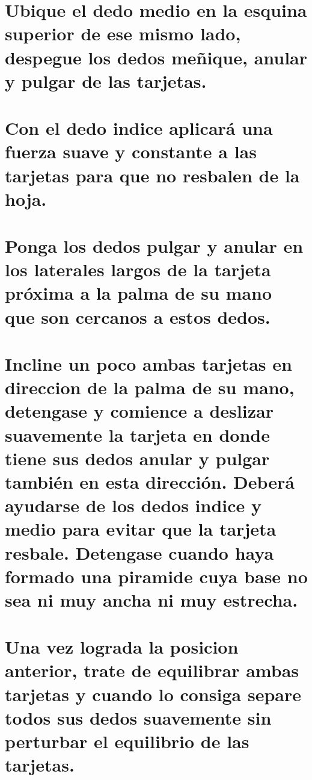 \documentclass{article}
\begin{document}
\section{Ubique el dedo medio en la esquina superior de ese mismo lado, despegue los dedos meñique, anular y pulgar de las tarjetas.}
\section{Con el dedo indice aplicará una fuerza suave y constante a las tarjetas para que no resbalen de la hoja.}
\newpage
\section{Ponga los dedos pulgar y anular en los laterales largos de la tarjeta próxima a la palma de su mano que son cercanos a estos dedos. }

\section{Incline un poco ambas tarjetas en direccion de la palma de su mano, detengase y comience a deslizar suavemente la tarjeta en donde tiene sus dedos anular y pulgar también en esta dirección. Deberá ayudarse de los dedos indice y medio para evitar que la tarjeta resbale. Detengase cuando haya formado una piramide cuya base no sea ni muy ancha ni muy estrecha.}
\section{Una vez lograda la posicion anterior, trate de equilibrar ambas tarjetas y cuando lo consiga separe todos sus dedos suavemente sin perturbar el equilibrio de las tarjetas.}
\end{document}
